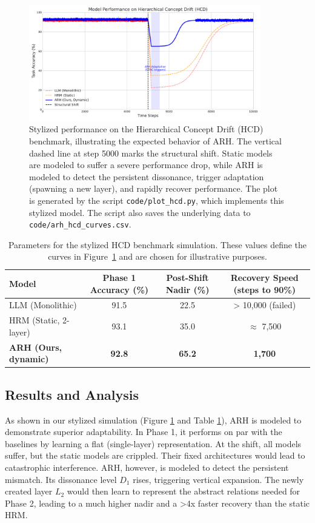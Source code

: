 \documentclass{article}
\begin{document}
\begin{figure}[h!]
    \centering
    \includegraphics[width=0.9\textwidth]{code/arh_hcd_visualization.pdf}
    \caption{Stylized performance on the Hierarchical Concept Drift (HCD) benchmark, illustrating the expected behavior of ARH. The vertical dashed line at step 5000 marks the structural shift. Static models are modeled to suffer a severe performance drop, while ARH is modeled to detect the persistent dissonance, trigger adaptation (spawning a new layer), and rapidly recover performance. The plot is generated by the script \texttt{code/plot\_hcd.py}, which implements this stylized model. The script also saves the underlying data to \texttt{code/arh\_hcd\_curves.csv}.}
    \label{fig:performance_plot}
\end{figure}

\begin{table}[h!]
\centering
\caption{Parameters for the stylized HCD benchmark simulation. These values define the curves in Figure~\ref{fig:performance_plot} and are chosen for illustrative purposes.}
\label{tab:results_hcd}
\begin{tabular}{@{}lccc@{}}
\toprule
Model & Phase 1 Accuracy (\%) & Post-Shift Nadir (\%) & Recovery Speed (steps to 90\%) \\
\midrule
LLM (Monolithic) & 91.5 & 22.5 & > 10,000 (failed) \\
HRM (Static, 2-layer) & 93.1 & 35.0 & $\approx$ 7,500 \\
\textbf{ARH (Ours, dynamic)} & \textbf{92.8} & \textbf{65.2} & \textbf{1,700} \\
\bottomrule
\end{tabular}
\end{table}

\subsection{Results and Analysis}
As shown in our stylized simulation (Figure \ref{fig:performance_plot} and Table \ref{tab:results_hcd}), ARH is modeled to demonstrate superior adaptability. In Phase 1, it performs on par with the baselines by learning a flat (single-layer) representation. At the shift, all models suffer, but the static models are crippled. Their fixed architectures would lead to catastrophic interference. ARH, however, is modeled to detect the persistent mismatch. Its dissonance level $D_1$ rises, triggering vertical expansion. The newly created layer $L_2$ would then learn to represent the abstract relations needed for Phase 2, leading to a much higher nadir and a >4x faster recovery than the static HRM.
\end{document}

